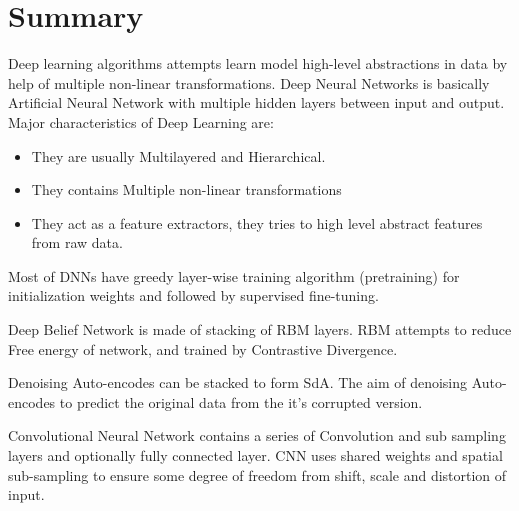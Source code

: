 \section{Summary}
Deep learning algorithms attempts learn model high-level abstractions in data by help of multiple non-linear transformations. Deep Neural Networks is basically Artificial Neural Network with multiple hidden layers between input and output. Major characteristics  of Deep Learning are:
\begin{itemize}
\item They are usually Multilayered and Hierarchical.
\item They contains Multiple non-linear transformations 
\item They act as a feature extractors, they tries to high level abstract features from raw data.
\end{itemize}

Most of DNNs have greedy layer-wise training algorithm (pretraining) for initialization weights and followed by supervised fine-tuning.
 
Deep Belief Network is made of stacking of RBM layers. RBM attempts to reduce Free energy of network, and trained by Contrastive Divergence.
  
Denoising Auto-encodes can be stacked to form SdA. The aim of denoising Auto-encodes to predict the original data from the it's corrupted version.

Convolutional Neural Network contains a series of Convolution and sub sampling layers and optionally fully connected layer. CNN uses shared weights and spatial sub-sampling to ensure some degree of freedom from shift, scale and distortion of input.
